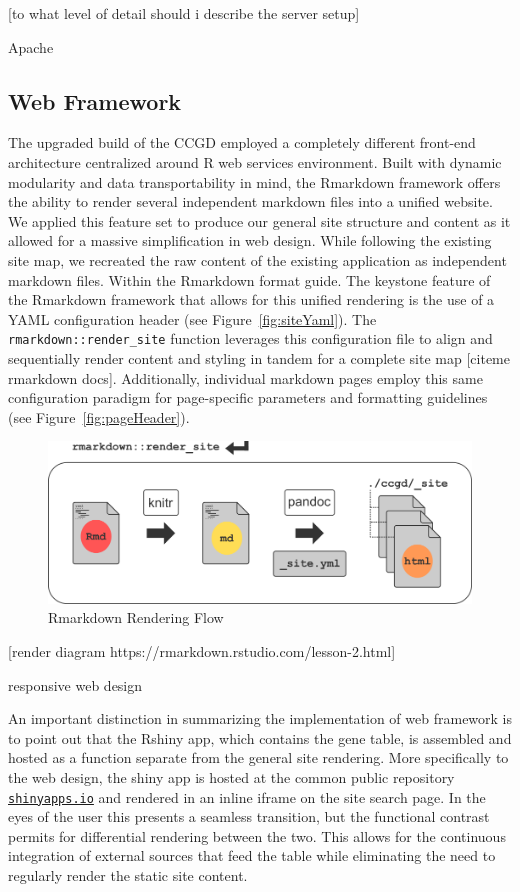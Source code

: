 \documentclass[10pt]{report}
\begin{document}
[to what level of detail should i describe the server setup]

Apache

\subsection{Web Framework}
The upgraded build of the CCGD employed a completely different front-end architecture centralized around R web services environment. Built with dynamic modularity and data transportability in mind, the Rmarkdown framework offers the ability to render several independent markdown files into a unified website. We applied this feature set to produce our general site structure and content as it allowed for a massive simplification in web design. While following the existing site map, we recreated the raw content of the existing application as independent markdown files. Within the Rmarkdown format guide. The keystone feature of the Rmarkdown framework that allows for this unified rendering is the use of a YAML configuration header (see Figure~\ref{fig:siteYaml}). The \texttt{rmarkdown::render\_site} function leverages this configuration file to align and sequentially render content and styling in tandem for a complete site map [citeme rmarkdown docs]. Additionally, individual markdown pages employ this same configuration paradigm for page-specific parameters and formatting guidelines (see Figure~\ref{fig:pageHeader}).

\begin{figure}[H]
    \includegraphics[width=\linewidth]{fig/rmarkdown_flow.png}
    \caption{Rmarkdown Rendering Flow}\label{fig:renderFlow}
\end{figure}

[render diagram https://rmarkdown.rstudio.com/lesson-2.html]

responsive web design

An important distinction in summarizing the implementation of web framework is to point out that the Rshiny app, which contains the gene table, is assembled and hosted as a function separate from the general site rendering. More specifically to the web design, the shiny app is hosted at the common public repository \href{https://ctastad.shinyapps.io/table_app/}{\texttt{shinyapps.io}} and rendered in an inline iframe on the site search page. In the eyes of the user this presents a seamless transition, but the functional contrast permits for differential rendering between the two. This allows for the continuous integration of external sources that feed the table while eliminating the need to regularly render the static site content.
\end{document}
